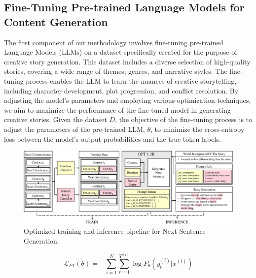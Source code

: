 \documentclass{article} %
\begin{document}
\subsection{Fine-Tuning Pre-trained Language Models for Content Generation}
The first component of our methodology involves fine-tuning pre-trained Language Models (LLMs) on a dataset specifically created for the purpose of creative story generation. This dataset includes a diverse selection of high-quality stories, covering a wide range of themes, genres, and narrative styles. The fine-tuning process enables the LLM to learn the nuances of creative storytelling, including character development, plot progression, and conflict resolution. By adjusting the model's parameters and employing various optimization techniques, we aim to maximize the performance of the fine-tuned model in generating creative stories.
Given the dataset $D$, the objective of the fine-tuning process is to adjust the parameters of the pre-trained LLM, $\theta$, to minimize the cross-entropy loss between the model's output probabilities and the true token labels.
\begin{figure}
    \centering
    \includegraphics[width=\linewidth]{figure/pipe.pdf}
    \caption{Optimized training and inference pipeline for Next Sentence Generation.}
    \label{fig:pipe}
\end{figure}

\begin{equation}
\mathcal{L}_{FT}(\theta) = - \sum_{i=1}^N \sum_{t=1}^{T^{(i)}} \log P_\theta(y_t^{(i)} | x^{(i)})
\end{equation}
\end{document}

